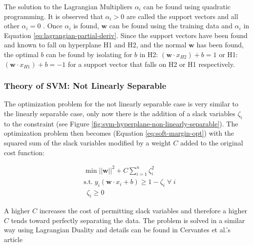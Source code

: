 The solution to the Lagrangian Multipliers $\alpha_i$ can be found using quadratic programming. It is observed that $\alpha_i > 0$ are called the support vectors and all other $\alpha_i = 0$ \cite{cervantesComprehensiveSurveySupport2020}. Once $\alpha_i$ is found, $\mathbf{w}$ can be found using the training data and $\alpha_i$ in Equation \ref{eq:lagrangian-partial-deriv}. Since the support vectors have been found and known to fall on hyperplane H1 and H2, and the normal $\mathbf{w}$ has been found, the optimal $b$ can be found by isolating for $b$ in H2: $(\mathbf{w} \cdot x_{H2}) + b = 1$ or H1: $(\mathbf{w} \cdot x_{H1}) + b = -1$ for a support vector that falls on H2 or H1 respectively.

\subsubsection{Theory of SVM: Not Linearly Separable}\label{sec:not-linearly-separable}
The optimization problem for the not linearly separable case is very similar to the linearly separable case, only now there is the addition of a slack variables $\zeta_i$ to the constraint (see Figure \ref{fig:svm-hyperplane-non-linearly-separable}). The optimization problem then becomes (Equation \ref{eq:soft-margin-opt}) \cite{cervantesComprehensiveSurveySupport2020} with the squared sum of the slack variables modified by a weight $C$ added to the original cost function:

\begin{equation}
    \label{eq:soft-margin-opt}
    \begin{split}
    & \min ||\mathbf{w}||^2 + C \sum_{i=1}^n \zeta_i^2 \\
    & \text{s.t.} \; y_i (\mathbf{w} \cdot x_i + b) \geq 1 - \zeta_i \; \forall \; i \\
    & \:\: \zeta_i \ge 0
    \end{split}
\end{equation}

A higher $C$ increases the cost of permitting slack variables and therefore a higher $C$ tends toward perfectly separating the data. The problem is solved in a similar way using Lagrangian Duality and details can be found in Cervantes et al.'s article \cite{cervantesComprehensiveSurveySupport2020}

